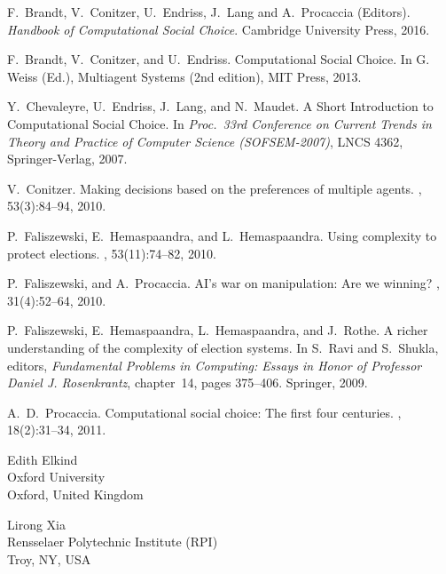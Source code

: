 \documentclass{comsoc2018}
\begin{document}
\begin{thebibliography}{1}

F.~Brandt, V.~Conitzer, U.~Endriss, J.~Lang and A.~Procaccia (Editors).
\newblock \emph{Handbook of Computational Social Choice}.
\newblock Cambridge University Press, 2016.


F.~Brandt, V.~Conitzer, and U.~Endriss.
\newblock Computational Social Choice. 
\newblock In G. Weiss (Ed.), Multiagent Systems (2nd edition), MIT Press, 2013.


Y.~Chevaleyre, U.~Endriss, J.~Lang, and N.~Maudet. 
A Short Introduction to Computational Social Choice. 
In \emph{Proc.\ 33rd Conference on Current Trends in 
Theory and Practice of Computer Science (SOFSEM-2007)}, 
LNCS 4362, Springer-Verlag, 2007.


V.~Conitzer.
\newblock Making decisions based on the preferences of multiple agents.
, 53(3):84--94, 2010.


P.~Faliszewski, E.~Hemaspaandra, and L.~Hemaspaandra.
\newblock Using complexity to protect elections.
, 53(11):74--82, 2010.

P.~Faliszewski, and A.~Procaccia.
\newblock AI's war on manipulation: Are we winning?
, 31(4):52--64, 2010.


P.~Faliszewski, E.~Hemaspaandra, L.~Hemaspaandra, and J.~Rothe.
\newblock A richer understanding of the complexity of election systems.
\newblock In S.~Ravi and S.~Shukla, editors, {\em Fundamental Problems in
  Computing: {Essays} in Honor of {Professor} {Daniel} {J.} {Rosenkrantz}},
  chapter~14, pages 375--406. Springer, 2009.

A.~D.~Procaccia.
\newblock Computational social choice: The first four centuries.
, 18(2):31--34, 2011.



\end{thebibliography}



\begin{contact}
Edith Elkind\\
Oxford University\\
Oxford, United Kingdom\\
\end{contact}

\begin{contact}
Lirong Xia\\
Rensselaer Polytechnic Institute (RPI)  \\
Troy, NY, USA\\
\end{contact}

\end{document}

